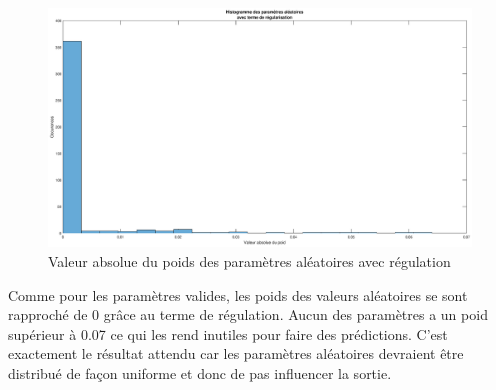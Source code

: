 \documentclass[a4paper, 12pt]{article} %
\begin{document}
\begin{figure}[H]
\label{randomWeightRegulation}
\caption{Valeur absolue du poids des paramètres aléatoires avec régulation}
\includegraphics[width=\textwidth,height=\textheight,keepaspectratio]{graphics/histoRandParameterRegulation.eps}
\end{figure}
Comme pour les paramètres valides, les poids des valeurs aléatoires se sont rapproché de 0 grâce au terme de régulation. Aucun des paramètres a un poid supérieur à 0.07 ce qui les rend inutiles pour faire des
prédictions. C'est exactement le résultat attendu car les paramètres aléatoires devraient être distribué de façon uniforme et donc de pas influencer la sortie.
\end{document}
